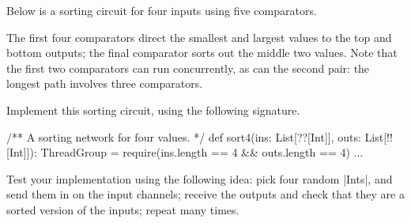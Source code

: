 \begin{question}
Below is a sorting circuit for four inputs using five comparators.
%
\begin{center}
\end{center}
%
The first four comparators direct the smallest and largest values to the top
and bottom outputs; the final comparator sorts out the middle two values.
Note that the first two comparators can run concurrently, as can the second
pair: the longest path involves  three comparators.

\begin{qpart}
\label{Q:sort4}
Implement this sorting circuit, using the following
signature.%
%  
\begin{scala}
  /** A sorting network for four values. */
  def sort4(ins: List[??[Int]], outs: List[!![Int]]): ThreadGroup = {
    require(ins.length == 4 && outs.length == 4)
    ...
  }
\end{scala}
%
Test your implementation using the following idea: pick four random |Ints|,
and send them in on the input channels; receive the outputs and check that
they are a sorted version of the inputs; repeat many times.
\end{qpart}



\end{question}
